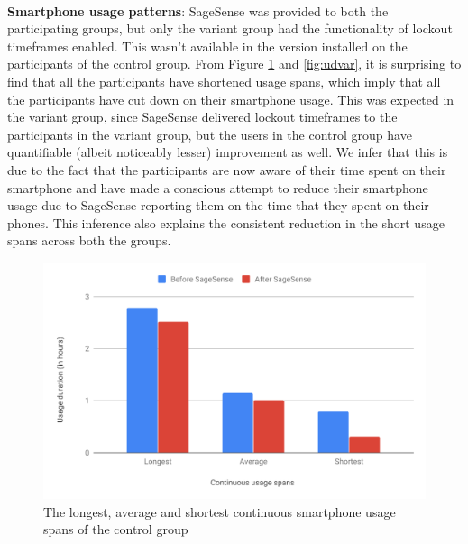 \documentclass{article}
\begin{document}
\paragraph{} \textbf{Smartphone usage patterns}: SageSense was provided to both the participating groups, but only the variant group had the functionality of lockout timeframes enabled. This wasn't available in the version installed on the participants of the control group. From Figure \ref{fig:udcon} and \ref{fig:udvar}, it is surprising to find that all the participants have shortened usage spans, which imply that all the participants have cut down on their smartphone usage. This was expected in the variant group, since SageSense delivered lockout timeframes to the participants in the variant group, but the users in the control group have quantifiable (albeit noticeably lesser) improvement as well. We infer that this is due to the fact that the participants are now aware of their time spent on their smartphone and have made a conscious attempt to reduce their smartphone usage due to SageSense reporting them on the time that they spent on their phones. This inference also explains the consistent reduction in the short usage spans across both the groups.

\begin{figure}[hbtp]
    \centering
    \includegraphics[width=\textwidth]{ud-control.pdf}
    \caption{The longest, average and shortest continuous smartphone usage spans of the control group}
    \label{fig:udcon}
\end{figure}
\end{document}
